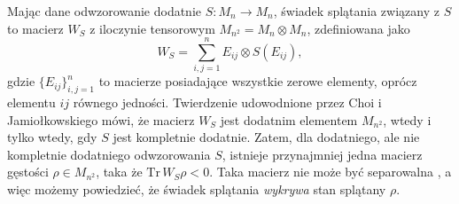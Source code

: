 {Mając dane odwzorowanie dodatnie $S: M_{n} \rightarrow M_{n}$,
świadek splątania związany z $S$ to macierz $W_{S}$ z
iloczynie tensorowym $M_{n^{2}} = M_{n} \! \otimes \! M_{n}$,
zdefiniowana jako
\begin{equation}
\label{def:entanglement-witness}
    W_{S} = \sum \limits_{i,j =1}^{n} E_{ij} \otimes S(E_{ij}),
\end{equation}
gdzie $\{ E_{ij}\}_{i,j=1}^{n}$ to macierze posiadające wszystkie
zerowe elementy, oprócz elementu $ij$ równego jedności.
Twierdzenie udowodnione przez Choi i Jamiołkowskiego
\cite{choi1975completely,jamiolkowski1974effective}
mówi, że macierz $W_{S}$ jest dodatnim elementem $M_{n^{2}}$,
wtedy i tylko wtedy, gdy $S$ jest kompletnie dodatnie.
Zatem, dla dodatniego, ale nie kompletnie dodatniego odwzorowania $S$,
istnieje przynajmniej jedna macierz gęstości $\rho \in M_{n^{2}}$,
taka że $\text{Tr}\, W_{S} \rho < 0$.
Taka macierz nie może być separowalna \cite{werner1989quantum},
a więc możemy powiedzieć, że świadek splątania \emph{wykrywa}
stan splątany $\rho$.

}
